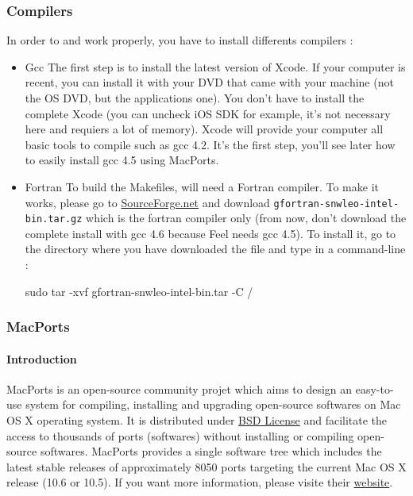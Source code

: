 \subsubsection{Compilers}

In order to \feel and \cmake work properly, you have to install differents compilers :
\begin{itemize}
\item Gcc
The first step is to install the latest version of Xcode. If your computer is recent, you can install it with your DVD that came with your machine (not the OS DVD, but the applications one). You don't have to install the complete Xcode (you can uncheck iOS SDK for example, it's not necessary here and requiers a lot of memory). Xcode will provide your computer all basic tools to compile such as gcc 4.2. It's the first step, you'll see later how to easily install gcc 4.5 using MacPorts.
\item Fortran
To build the Makefiles, \cmake will need a Fortran compiler. To make it works, please go to \href{http://hpc.sourceforge.net/}{SourceForge.net} and download \verb|gfortran-snwleo-intel-bin.tar.gz| which is the fortran compiler only (from now, don't download the complete install with gcc 4.6 because Feel needs gcc 4.5). To install it, go to the directory where you have downloaded the file and type in a command-line :
\begin{unixcom}
		sudo tar -xvf gfortran-snwleo-intel-bin.tar -C /
\end{unixcom}

\end{itemize}

\subsubsection{MacPorts}

\paragraph{Introduction}
MacPorts is an open-source community projet which aims to design an easy-to-use system for compiling, installing and upgrading open-source softwares on Mac OS X operating system. It is distributed under \href{http://opensource.org/licenses/bsd-license.php}{BSD License} and facilitate the access to thousands of ports (softwares) without installing or compiling open-source softwares.
MacPorts provides a single software tree which includes the latest stable releases of approximately 8050 ports targeting the current Mac OS X release (10.6 or 10.5). If you want more information, please visite their \href{http://www.macports.org/}{website}.

